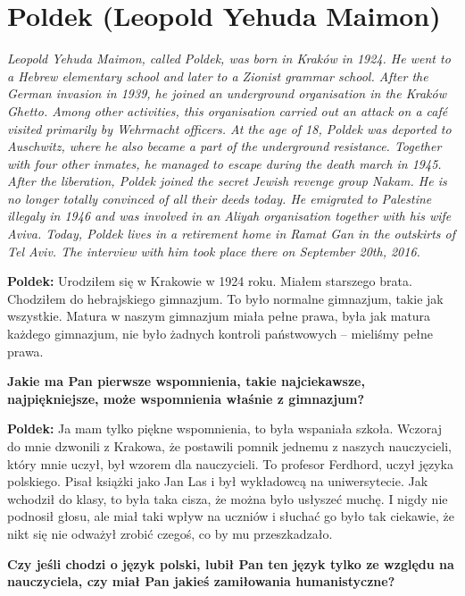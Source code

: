 \section{Poldek (Leopold Yehuda Maimon)}
\begin{otherlanguage}{polish}
\textit{Leopold Yehuda Maimon, called Poldek, was born in Kraków in 1924. He went to a Hebrew elementary school and later to a Zionist grammar school. After the German invasion in 1939, he joined an underground organisation in the Kraków Ghetto. Among other activities, this organisation carried out an attack on a café visited primarily by Wehrmacht officers. At the age of 18, Poldek was deported to Auschwitz, where he also became a part of the underground resistance. Together with four other inmates, he managed to escape during the death march in 1945.\\
After the liberation, Poldek joined the secret Jewish revenge group Nakam. He is no longer totally convinced of all their deeds today. He emigrated to Palestine illegaly in 1946 and was involved in an Aliyah organisation together with his wife Aviva. Today, Poldek lives in a retirement home in Ramat Gan in the outskirts of Tel Aviv. The interview with him took place there on September 20th, 2016.}\par
\vspace*{2em}
\textbf{Poldek:} Urodziłem się w Krakowie w 1924 roku. Miałem starszego brata. Chodziłem do hebrajskiego gimnazjum. To było normalne gimnazjum, takie jak wszystkie. Matura w naszym gimnazjum miała pełne prawa, była jak matura każdego gimnazjum, nie było żadnych kontroli państwowych – mieliśmy pełne prawa.

\textbf{Jakie ma Pan pierwsze wspomnienia, takie najciekawsze, najpiękniejsze, może wspomnienia właśnie z gimnazjum?}

\textbf{Poldek:} Ja mam tylko piękne wspomnienia, to była wspaniała szkoła. Wczoraj do mnie dzwonili z Krakowa, że postawili pomnik jednemu z naszych nauczycieli, który mnie uczył, był wzorem dla nauczycieli. To profesor Ferdhord, uczył języka polskiego. Pisał książki jako Jan Las i był wykładowcą na uniwersytecie. Jak wchodził do klasy, to była taka cisza, że można było usłyszeć muchę. I nigdy nie podnosił głosu, ale miał taki wpływ na uczniów i słuchać go było tak ciekawie, że nikt się nie odważył zrobić czegoś, co by mu przeszkadzało. 

\textbf{Czy jeśli chodzi o język polski, lubił Pan ten język tylko ze względu na nauczyciela, czy miał Pan jakieś zamiłowania humanistyczne?}
 

\end{otherlanguage}
